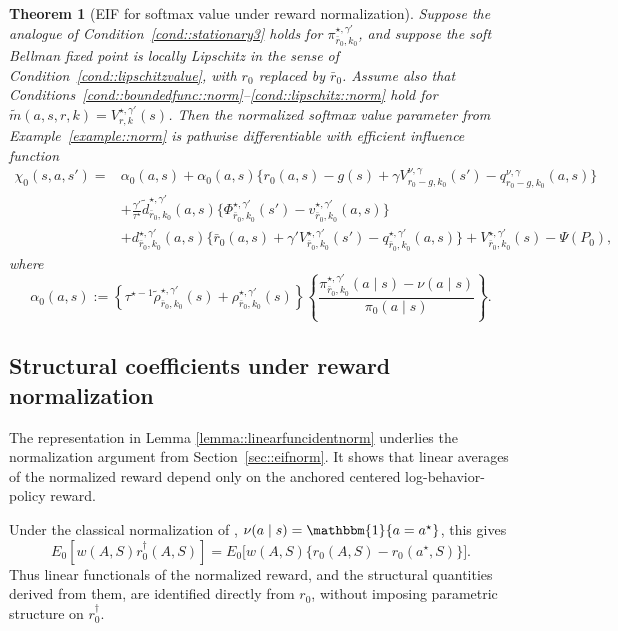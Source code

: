 \documentclass[11pt]{article}
\theoremstyle{plain}
\newtheorem{theorem}{Theorem}
\begin{document}
\begin{theorem}[EIF for softmax value under reward normalization]
\label{theorem::EIFsoftmaxnorm}
Suppose the analogue of Condition~\ref{cond::stationary3} holds for
\(\pi_{\bar r_0,k_0}^{\star,\gamma'}\), and suppose the soft Bellman fixed point
is locally Lipschitz in the sense of Condition~\ref{cond::lipschitzvalue}, with
\(r_0\) replaced by \(\bar r_0\). Assume also that
Conditions~\ref{cond::boundedfunc::norm}--\ref{cond::lipschitz::norm} hold for
\(\tilde m(a,s,r,k)=V_{r,k}^{\star,\gamma'}(s)\). Then the normalized softmax
value parameter from Example~\ref{example::norm} is pathwise differentiable with
efficient influence function
\begin{align*}
\chi_0(s,a,s')
={}& \alpha_0(a,s)
+ \alpha_0(a,s)
   \bigl\{r_0(a,s)-g(s)+\gamma V_{r_0-g,k_0}^{\nu,\gamma}(s')
   -q_{r_0-g,k_0}^{\nu,\gamma}(a,s)\bigr\} \\
&+ \frac{\gamma'}{\tau^\star}
   \widetilde d_{\bar r_0,k_0}^{\star,\gamma'}(a,s)
   \bigl\{\Phi_{\bar r_0,k_0}^{\star,\gamma'}(s')
   -v_{\bar r_0,k_0}^{\star,\gamma'}(a,s)\bigr\} \\
&+ d_{\bar r_0,k_0}^{\star,\gamma'}(a,s)
   \bigl\{\bar r_0(a,s)+\gamma' V_{\bar r_0,k_0}^{\star,\gamma'}(s')
   -q_{\bar r_0,k_0}^{\star,\gamma'}(a,s)\bigr\}
+ V_{\bar r_0,k_0}^{\star,\gamma'}(s) - \Psi(P_0),
\end{align*}
where
\[
\alpha_0(a,s)
:=
\left\{\tau^{\star -1}
\widetilde \rho_{\bar r_0,k_0}^{\star,\gamma'}(s)
+ \rho_{\bar r_0,k_0}^{\star,\gamma'}(s)\right\}
\left\{
\frac{\pi_{\bar r_0,k_0}^{\star,\gamma'}(a\mid s)-\nu(a\mid s)}
{\pi_0(a\mid s)}
\right\}.
\]
\end{theorem}

\subsection{Structural coefficients under reward normalization}

The representation in Lemma \ref{lemma::linearfuncidentnorm} underlies the normalization argument from
Section~\ref{sec::eifnorm}. It shows that linear averages of the normalized
reward depend only on the anchored centered log-behavior-policy reward.

 
 

Under the classical normalization of \citet{rust1987optimal},
\(\nu(a\mid s)=\mathbbm{1}\{a=a^\star\}\), this gives
\[
E_0[w(A,S) r_0^\dagger(A,S)]
= E_0\!\big[w(A,S)\{r_0(A,S)-r_0(a^\star,S)\}\big].
\]
Thus linear functionals of the normalized reward, and the structural quantities
derived from them, are identified directly from \(r_0\), without imposing
parametric structure on \(r_0^\dagger\).
\end{document}
